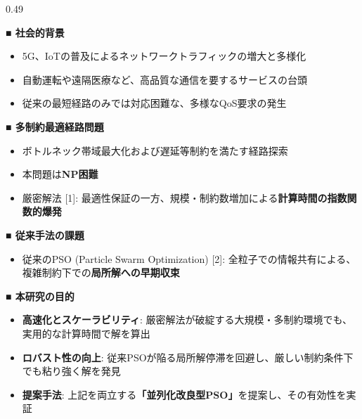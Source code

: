 \documentclass[final,t]{beamer}
\begin{document}
\begin{frame}[fragile]
\begin{columns}[t, onlytextwidth]
\begin{column}{0.49\textwidth}
        \begin{tcolorbox}[colback=white, colframe=white, boxrule=0pt, left=0pt, right=0pt, top=5pt, bottom=5pt]
            \normalsize
            \textbf{■ 社会的背景}
            \begin{itemize}
                \item 5G、IoTの普及によるネットワークトラフィックの増大と多様化
                \item 自動運転や遠隔医療など、高品質な通信を要するサービスの台頭
                \item 従来の最短経路のみでは対応困難な、多様なQoS要求の発生
            \end{itemize}
            \vspace{0.5em}
            \textbf{■ 多制約最適経路問題}
            \begin{itemize}
                \item ボ\hspace{0.01em}ト\hspace{-0.2em}ルネック帯域最大化および遅延等制約を満たす経路探索
                \item 本問題は\textcolor{AlertRed}{\textbf{NP困難}}
                \item {厳密解法 [1]}: 最適性保証の一方、規模・制約数増加による\textbf{計算時間の指数関数的爆発}
            \end{itemize}
            \vspace{0.5em}
            \textbf{■ 従来手法の課題}
            \begin{itemize}
                \item {従来のPSO (Particle Swarm Optimization) [2]}: 全粒子での情報共有による、複雑制約下での\textbf{局所解への早期収束}
            \end{itemize}
            
            \vspace{0.5em}
            
            \textbf{■ 本研究の目的}
            \begin{itemize}
                \item \textbf{高速化とスケーラビリティ}: 厳密解法が破綻する大規模・多制約環境でも、実用的な計算時間で解を算出
                \item \textbf{ロバスト\hspace{-0.2em}性の向上}: 従来PSOが陥る局所解停滞を回避し、厳しい制約条件下でも粘り強く解を発見
                \item \textbf{提案手法}: 上記を両立する\textcolor{AlertRed}{\textbf{「並列化改良型PSO」}}を提案し、その有効性を実証
            \end{itemize}
        \end{tcolorbox}


\end{column}
\end{columns}
\end{frame}
\end{document}
